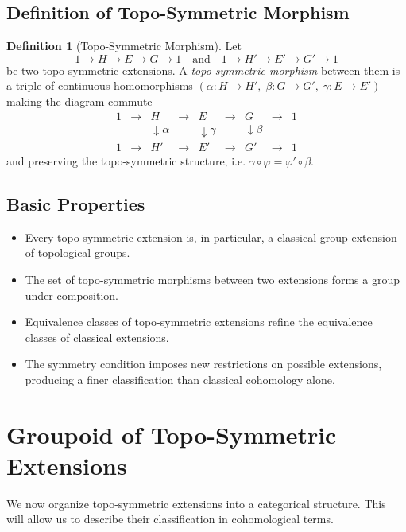\documentclass[11pt,a4paper]{article}
\theoremstyle{plain}
\theoremstyle{definition}
\newtheorem{definition}[theorem]{Definition}
\theoremstyle{remark}
\begin{document}
	\subsection{Definition of Topo-Symmetric Morphism}
	
	\begin{definition}[Topo-Symmetric Morphism]
		Let 
		\[
		1 \to H \to E \to G \to 1
		\quad \text{and} \quad
		1 \to H' \to E' \to G' \to 1
		\]
		be two topo-symmetric extensions. 
		A \emph{topo-symmetric morphism} between them is a triple of continuous homomorphisms 
		$(\alpha : H \to H',\; \beta : G \to G',\; \gamma : E \to E')$
		making the diagram commute
		\[
		\begin{array}{ccccccccc}
			1 & \to & H & \to & E & \to & G & \to & 1 \\
			&     & \downarrow \alpha & & \downarrow \gamma & & \downarrow \beta & &   \\
			1 & \to & H' & \to & E' & \to & G' & \to & 1
		\end{array}
		\]
		and preserving the topo-symmetric structure, i.e. $\gamma \circ \varphi = \varphi' \circ \beta$.
	\end{definition}
	
	\subsection{Basic Properties}
	
	\begin{itemize}
		\item Every topo-symmetric extension is, in particular, a classical group extension of topological groups.  
		\item The set of topo-symmetric morphisms between two extensions forms a group under composition.  
		\item Equivalence classes of topo-symmetric extensions refine the equivalence classes of classical extensions.  
		\item The symmetry condition imposes new restrictions on possible extensions, producing a finer classification than classical cohomology alone.  
	\end{itemize}
	
	
	\section{Groupoid of Topo-Symmetric Extensions}
	
	We now organize topo-symmetric extensions into a categorical structure.  
	This will allow us to describe their classification in cohomological terms.
	
\end{document}
